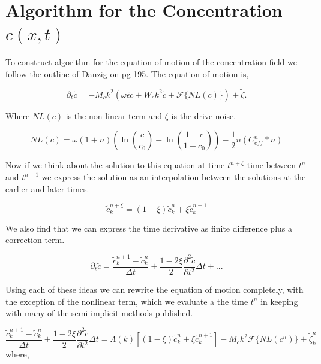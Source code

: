 \documentclass[11pt]{article}
\begin{document}
 

\section{Algorithm for the Concentration $c(x,t)$}

To construct algorithm for the equation of motion of the concentration field we follow the outline of Danzig on pg 195. The equation of motion is, 

\begin{equation}
\partial_t \tilde{c} = -M_c k^2\left(\omega\epsilon\tilde{c} + W_c k^2\tilde{c} + \mathcal{F}\lbrace NL(c) \rbrace\right) + \tilde{\zeta}.
\end{equation}

Where $NL(c)$ is the non-linear term and $\zeta$ is the drive noise. 

\begin{equation}
NL(c) = \omega(1+n)\left(\ln\left(\frac{c}{c_0}\right) - \ln\left(\frac{1-c}{1-c_0}\right)\right) - \frac{1}{2} n \left(C_{eff}^n\ast n\right)
\end{equation}

Now if we think about the solution to this equation at time $t^{n+\xi}$ time between $t^n$ and $t^{n+1}$ we express the solution as an interpolation between the solutions at the earlier and later times.

\begin{equation}
\tilde{c}_k^{n + \xi} = (1-\xi)\tilde{c}_k^n + \xi\tilde{c}_k^{n+1}
\end{equation}

We also find that we can express the time derivative as finite difference plus a correction term. 

\begin{equation}
\partial_t \tilde{c} = \frac{\tilde{c}_k^{n+1} - \tilde{c}_k^{n}}{\Delta t} + 
\frac{1 - 2\xi}{2} \frac{\partial^2 \tilde{c}}{\partial t^2}\Delta t + ...
\end{equation}

Using each of these ideas we can rewrite the equation of motion completely, with the exception of the nonlinear term, which we evaluate a the time $t^n$ in keeping with many of the semi-implicit methods published.

\begin{equation}
\frac{\tilde{c}_k^{n+1} - \tilde{c}_k^{n}}{\Delta t} + 
\frac{1 - 2\xi}{2} \frac{\partial^2 \tilde{c}}{\partial t^2}\Delta t = 
\Lambda(k)\left[(1-\xi)\tilde{c}_k^n + \xi\tilde{c}_k^{n+1}\right] - M_c k^2 \mathcal{F}\lbrace NL(c^n)\rbrace + \tilde{\zeta}_k^n
\end{equation}
where, 
\end{document}
